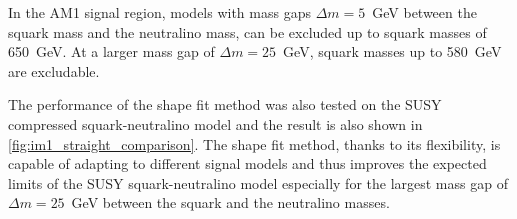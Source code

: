 In the AM1 signal region, models with mass gaps $\Delta m = 5$~GeV between the
squark mass and the neutralino mass, can be excluded up to squark masses of
650~GeV. At a larger mass gap of $\Delta m = 25$~GeV, squark masses up to
580~GeV are excludable.

The performance of the shape fit method was also tested on the SUSY compressed
squark-neutralino model and the result is also shown in
\cref{fig:im1_straight_comparison}. The shape fit method, thanks to its
flexibility, is capable of adapting to different signal models and thus improves
the expected limits of the SUSY squark-neutralino model especially for the
largest mass gap of $\Delta m = 25$~GeV between the squark and the neutralino
masses.
